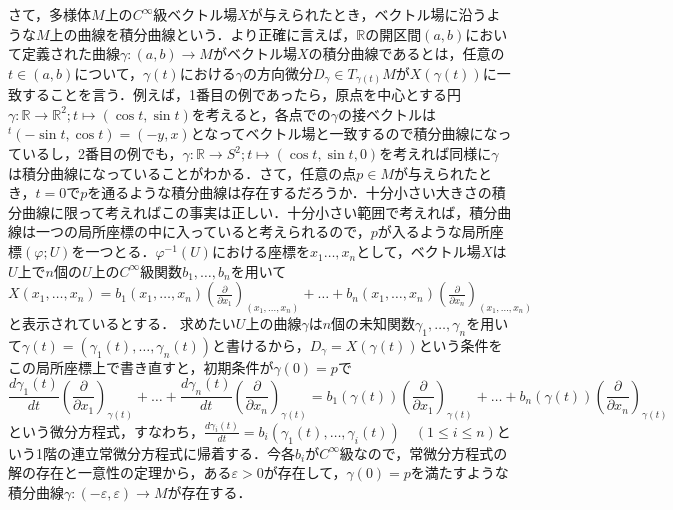 \documentclass{jsarticle}
\def\realnum{{\mathbb R}}
\def\dfrac{\displaystyle\frac}
\def\tenchi{{}^t\!}
\def\xvec{(x_1,\dots,x_n)}
\begin{document}
さて，多様体$M$上の$C^\infty$級ベクトル場$X$が与えられたとき，ベクトル場に沿うような$M$上の曲線を積分曲線という．より正確に言えば，$\realnum$の開区間$(a,b)$において定義された曲線$\gamma:(a,b)\rightarrow M$がベクトル場$X$の積分曲線であるとは，任意の$t\in(a,b)$について，$\gamma(t)$における$\gamma$の方向微分$D_\gamma\in T_{\gamma(t)}M$が$X(\gamma(t))$に一致することを言う．例えば，1番目の例であったら，原点を中心とする円$\gamma:\realnum\rightarrow \realnum^2;t\mapsto (\cos t,\sin t)$を考えると，各点での$\gamma$の接ベクトルは$\tenchi(-\sin t,\cos t)=(-y,x)$となってベクトル場と一致するので積分曲線になっているし，2番目の例でも，$\gamma:\realnum\rightarrow S^2;t\mapsto (\cos t,\sin t,0)$を考えれば同様に$\gamma$は積分曲線になっていることがわかる．さて，任意の点$p\in M$が与えられたとき，$t=0$で$p$を通るような積分曲線は存在するだろうか．十分小さい大きさの積分曲線に限って考えればこの事実は正しい．十分小さい範囲で考えれば，積分曲線は一つの局所座標の中に入っていると考えられるので，$p$が入るような局所座標$(\varphi;U)$を一つとる．$\varphi^{-1}(U)$における座標を$x_1\dots,x_n$として，ベクトル場$X$は$U$上で$n$個の$U$上の$C^\infty$級関数$b_1,\dots,b_n$を用いて$X\xvec=b_1\xvec\left(\dfrac{\partial}{\partial x_1}\right)_{\xvec}+\dots+b_n\xvec\left(\dfrac{\partial}{\partial x_n}\right)_{\xvec}$と表示されているとする．
求めたい$U$上の曲線$\gamma$は$n$個の未知関数$\gamma_1,\dots,\gamma_n$を用いて$\gamma(t)=(\gamma_1(t),\dots,\gamma_n(t))$と書けるから，$D_\gamma=X(\gamma(t))$という条件をこの局所座標上で書き直すと，初期条件が$\gamma(0)=p$で
$$
\frac{d\gamma_1(t)}{dt}\left(\dfrac{\partial}{\partial x_1}\right)_{\gamma(t)}+\dots+\frac{d\gamma_n(t)}{dt}\left(\dfrac{\partial}{\partial x_n}\right)_{\gamma(t)}
=b_1(\gamma(t))\left(\dfrac{\partial}{\partial x_1}\right)_{\gamma(t)}+\dots+b_n(\gamma(t))\left(\dfrac{\partial}{\partial x_n}\right)_{\gamma(t)}
$$
という微分方程式，すなわち，$\dfrac{d\gamma_i(t)}{dt}=b_i(\gamma_1(t),\dots,\gamma_i(t))\quad(1\le i\le n)$という1階の連立常微分方程式に帰着する．今各$b_i$が$C^\infty$級なので，常微分方程式の解の存在と一意性の定理から，ある$\varepsilon>0$が存在して，$\gamma(0)=p$を満たすような積分曲線$\gamma:(-\varepsilon,\varepsilon)\rightarrow M$が存在する．
\end{document}
